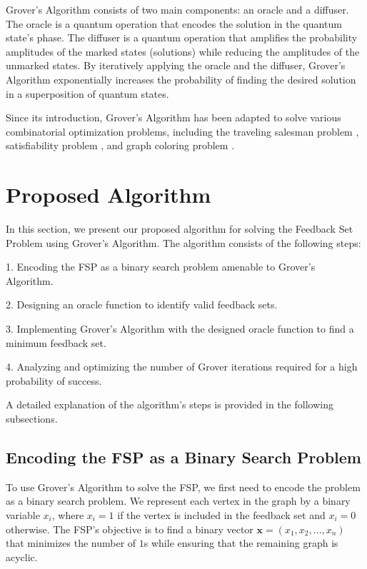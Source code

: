 Grover's Algorithm consists of two main components: an oracle and a diffuser. The oracle is a quantum operation that encodes the solution in the quantum state's phase. The diffuser is a quantum operation that amplifies the probability amplitudes of the marked states (solutions) while reducing the amplitudes of the unmarked states. By iteratively applying the oracle and the diffuser, Grover's Algorithm exponentially increases the probability of finding the desired solution in a superposition of quantum states.

Since its introduction, Grover's Algorithm has been adapted to solve various combinatorial optimization problems, including the traveling salesman problem \cite{TravellingSalesman}, satisfiability problem \cite{Satisfiability}, and graph coloring problem \cite{GraphColoring}.

\section{Proposed Algorithm}
\label{sec:proposed_algorithm}

In this section, we present our proposed algorithm for solving the Feedback Set Problem using Grover's Algorithm. The algorithm consists of the following steps:

1. Encoding the FSP as a binary search problem amenable to Grover's Algorithm.

2. Designing an oracle function to identify valid feedback sets.

3. Implementing Grover's Algorithm with the designed oracle function to find a minimum feedback set.

4. Analyzing and optimizing the number of Grover iterations required for a high probability of success.

A detailed explanation of the algorithm's steps is provided in the following subsections.

\subsection{Encoding the FSP as a Binary Search Problem}
\label{subsec:encoding}

To use Grover's Algorithm to solve the FSP, we first need to encode the problem as a binary search problem. We represent each vertex in the graph by a binary variable $x_i$, where $x_i = 1$ if the vertex is included in the feedback set and $x_i = 0$ otherwise. The FSP's objective is to find a binary vector $\mathbf{x} = (x_1, x_2, \dots, x_n)$ that minimizes the number of $1$s while ensuring that the remaining graph is acyclic.

